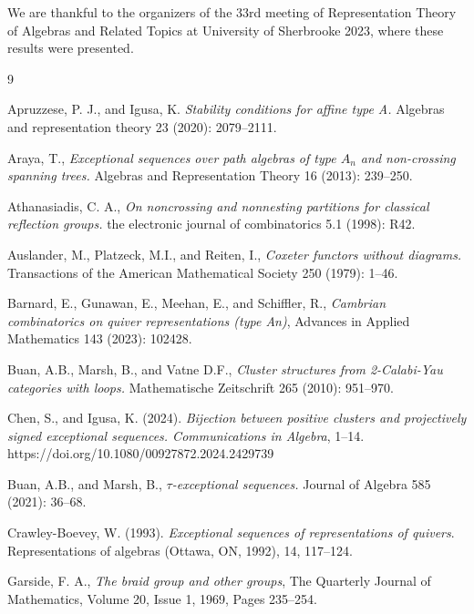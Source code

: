 \documentclass[11pt]{amsart}
\theoremstyle{definition}
\theoremstyle{remark}
\numberwithin{equation}{section}
\begin{document}
We are thankful to the organizers of the 33rd meeting of Representation Theory of Algebras and Related Topics at University of Sherbrooke 2023, where these results were presented.



\begin{thebibliography}{9}


 Apruzzese, P. J., and Igusa, K. \emph{Stability conditions for affine type A.} Algebras and representation theory 23 (2020): 2079--2111. %

 Araya, T., \emph{Exceptional sequences over path algebras of type $A_n$ and non-crossing spanning trees.} Algebras and Representation Theory 16 (2013): 239--250. %

 Athanasiadis, C. A., \emph{On noncrossing and nonnesting partitions for classical reflection groups.} the electronic journal of combinatorics 5.1 (1998): R42.  %

 Auslander, M., Platzeck, M.I., and Reiten, I., \emph{Coxeter functors without diagrams.} Transactions of the American Mathematical Society 250 (1979): 1--46. %


 Barnard, E., Gunawan, E., Meehan, E., and Schiffler, R., \emph{Cambrian combinatorics on quiver representations (type An)}, Advances in Applied Mathematics 143 (2023): 102428. %

 Buan, A.B., Marsh, B., and Vatne D.F., \emph{Cluster structures from 2-Calabi-Yau categories with loops.} Mathematische Zeitschrift 265 (2010): 951--970. %

 Chen, S., and Igusa, K. (2024). \emph{Bijection between positive clusters and projectively signed exceptional sequences. Communications in Algebra}, 1--14. https://doi.org/10.1080/00927872.2024.2429739

 Buan, A.B., and Marsh, B., \emph{$\tau$-exceptional sequences.} Journal of Algebra 585 (2021): 36--68. %


 Crawley-Boevey, W. (1993). \textit{Exceptional sequences of representations of quivers}. Representations of algebras (Ottawa, ON, 1992), 14, 117--124.%



 Garside, F. A., \emph{The braid group and other groups}, The Quarterly Journal of Mathematics, Volume 20, Issue 1, 1969, Pages 235--254. %



\end{thebibliography}
\end{document}
